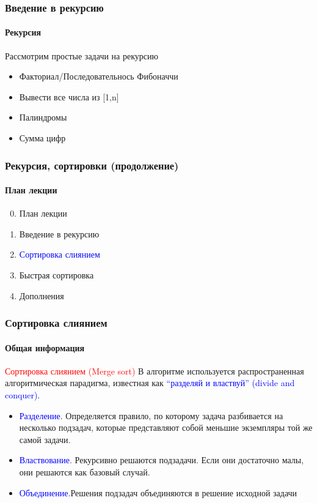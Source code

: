 \documentclass[aspectratio=169]{beamer}
\begin{document}
\begin{frame}
\frametitle{Введение в рекурсию}
\framesubtitle{Рекурсия}
\justifying
Рассмотрим простые задачи на рекурсию
\begin{itemize}
\item{Факториал/Последовательнось Фибоначчи}
\item{Вывести все числа из [1,n]}
\item{Палиндромы}
\item{Сумма цифр}
\end{itemize}
\end{frame}

\begin{frame}
\frametitle{Рекурсия, сортировки (продолжение)}
\framesubtitle{План лекции}

\begin{enumerate}
  \setcounter{enumi}{-1}
  \item{План лекции}
  \item{Введение в рекурсию}
  \item{\textcolor{blue}{Сортировка слиянием}}
  \item{Быстрая сортировка}
  \item{Дополнения}
\end{enumerate}
\end{frame}



\begin{frame}
\frametitle{Сортировка слиянием}
\framesubtitle{Общая информация}
\justifying
\textcolor{red}{Сортировка слиянием (Merge sort)}\newline\newline
В алгоритме используется распространенная алгоритмическая парадигма, известная как \textcolor{blue}{“разделяй и властвуй” (divide and conquer)}. \newline
\begin{itemize}
\item{\textcolor{blue}{Разделение}. Определяется правило, по которому задача разбивается на несколько подзадач, которые представляют собой меньшие экземпляры той же самой задачи.}
\item{\textcolor{blue}{Властвование}. Рекурсивно решаются подзадачи. Если они достаточно малы, они решаются как базовый случай.}
\item{\textcolor{blue}{Объединение}.Решения подзадач объединяются в решение исходной задачи}
\end{itemize}

\end{frame}
\end{document}
